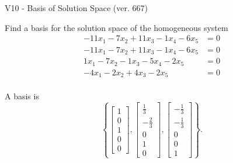 \begin{exercise}
  \begin{exerciseTitle}V10 - Basis of Solution Space (ver. 667)\end{exerciseTitle}
  \begin{exerciseStatement}
    Find a basis for the solution space of the homogeneous system 
\begin{align*}
 -11 x_ 1 -7 x_ 2 + 11 x_ 3 -1 x_ 4 -6 x_ 5 &= 0  \\ 
  -11 x_ 1 -7 x_ 2 + 11 x_ 3 -1 x_ 4 -6 x_ 5 &= 0  \\ 
  1 x_ 1 -7 x_ 2 -1 x_ 3 -5 x_ 4 -2 x_ 5 &= 0  \\ 
  -4 x_ 1 -2 x_ 2 + 4 x_ 3 -2 x_ 5 &= 0  \\ 
 \end{align*}


 
  \end{exerciseStatement}

  \begin{exerciseAnswer}
   A basis is   
\[\left\{\left[\begin{array}{c}
1 \\
0 \\
1 \\
0 \\
0
\end{array}\right] , \left[\begin{array}{c}
\frac{1}{3} \\
-\frac{2}{3} \\
0 \\
1 \\
0
\end{array}\right] , \left[\begin{array}{c}
-\frac{1}{3} \\
-\frac{1}{3} \\
0 \\
0 \\
1
\end{array}\right]\right\}.\]

  


  \end{exerciseAnswer}
\end{exercise}